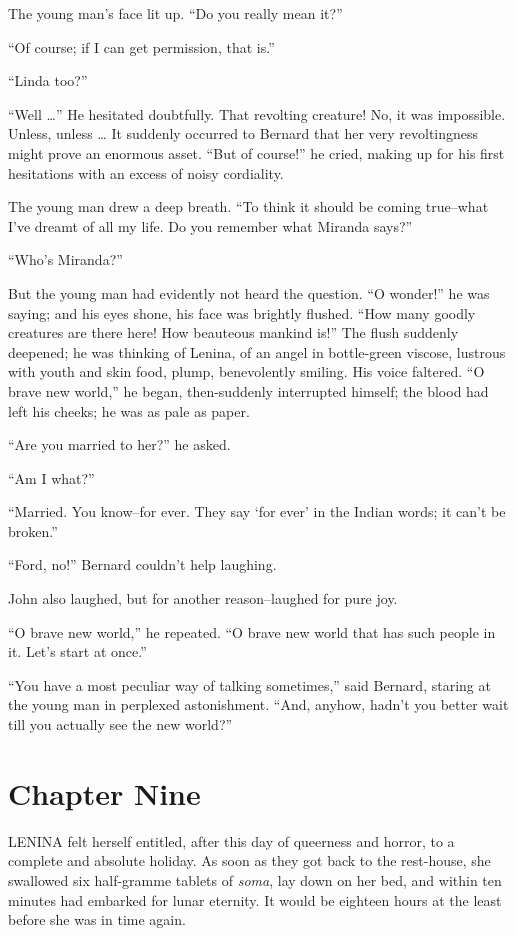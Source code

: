 \documentclass[12pt]{report}
\newcommand{\mychapter}[2]{
\setcounter{chapter}{#1}
    \setcounter{section}{0}
    \chapter*{#2}
    \addcontentsline{toc}{chapter}{#2}
}
\begin{document}
The young man's face lit up. ``Do you really mean it?''

``Of course; if I can get permission, that is.''

``Linda too?''

``Well \ldots{}'' He hesitated doubtfully. That revolting creature! No,
it was impossible. Unless, unless \ldots{} It suddenly occurred to
Bernard that her very revoltingness might prove an enormous asset. ``But
of course!'' he cried, making up for his first hesitations with an
excess of noisy cordiality.

The young man drew a deep breath. ``To think it should be coming
true--what I've dreamt of all my life. Do you remember what Miranda
says?''

``Who's Miranda?''

But the young man had evidently not heard the question. ``O wonder!'' he
was saying; and his eyes shone, his face was brightly flushed. ``How
many goodly creatures are there here! How beauteous mankind is!'' The
flush suddenly deepened; he was thinking of Lenina, of an angel in
bottle-green viscose, lustrous with youth and skin food, plump,
benevolently smiling. His voice faltered. ``O brave new world,'' he
began, then-suddenly interrupted himself; the blood had left his cheeks;
he was as pale as paper.

``Are you married to her?'' he asked.

``Am I what?''

``Married. You know--for ever. They say `for ever' in the Indian words;
it can't be broken.''

``Ford, no!'' Bernard couldn't help laughing.

John also laughed, but for another reason--laughed for pure joy.

``O brave new world,'' he repeated. ``O brave new world that has such
people in it. Let's start at once.''

``You have a most peculiar way of talking sometimes,'' said Bernard,
staring at the young man in perplexed astonishment. ``And, anyhow,
hadn't you better wait till you actually see the new world?''

\mychapter{9}{Chapter Nine}
LENINA felt herself entitled, after this day of queerness and horror, to
a complete and absolute holiday. As soon as they got back to the
rest-house, she swallowed six half-gramme tablets of \emph{soma}, lay
down on her bed, and within ten minutes had embarked for lunar eternity.
It would be eighteen hours at the least before she was in time again.
\end{document}
